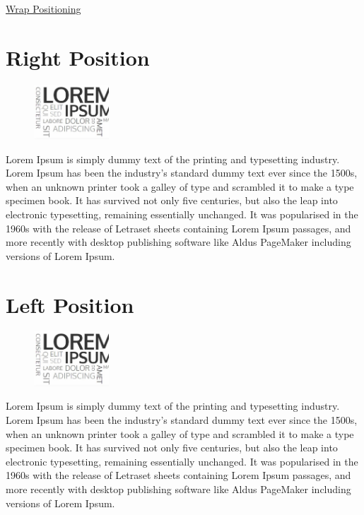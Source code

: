\documentclass{article}
\begin{document}
\begin{center}
    \Large \underline {Wrap Positioning}
\end{center}

\section{Right Position} 

\begin{figure} %
\centering 
\includegraphics[width=0.25\textwidth]{Lorem} %
\end{figure} 
Lorem Ipsum is simply dummy text of the printing and typesetting industry. Lorem Ipsum has been the industry's standard dummy text ever since the 1500s, when an unknown printer took a galley of type and scrambled it to make a type specimen book. It has survived not only five centuries, but also the leap into electronic typesetting, remaining essentially unchanged. It was popularised in the 1960s with the release of Letraset sheets containing Lorem Ipsum passages, and more recently with desktop publishing software like Aldus PageMaker including versions of Lorem Ipsum.


\section{Left Position} 

\begin{figure} %
\centering 
\includegraphics[width=0.25\textwidth]{Lorem}
\end{figure} 
Lorem Ipsum is simply dummy text of the printing and typesetting industry. Lorem Ipsum has been the industry's standard dummy text ever since the 1500s, when an unknown printer took a galley of type and scrambled it to make a type specimen book. It has survived not only five centuries, but also the leap into electronic typesetting, remaining essentially unchanged. It was popularised in the 1960s with the release of Letraset sheets containing Lorem Ipsum passages, and more recently with desktop publishing software like Aldus PageMaker including versions of Lorem Ipsum.
\end{document}
